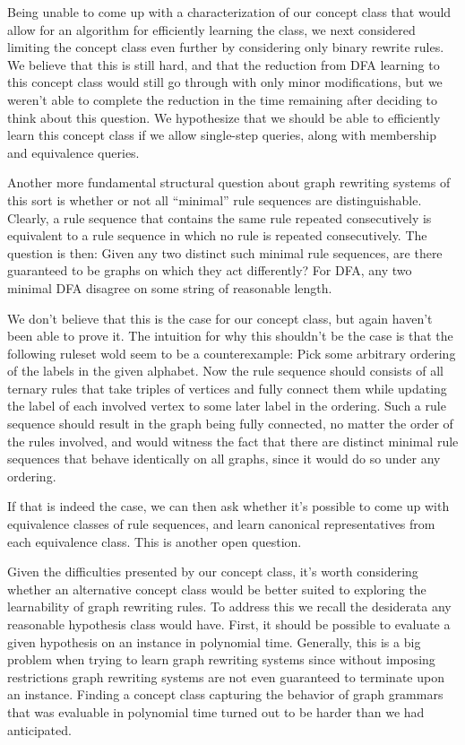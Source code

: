 \documentclass[]{article}
\begin{document}
Being unable to come up with a characterization of our concept class that would
allow for an algorithm for efficiently learning the class, we next considered
limiting the concept class even further by considering only binary rewrite
rules. We believe that this is still hard, and that the reduction from DFA
learning to this concept class would still go through with only minor
modifications, but we weren't able to complete the reduction in the time
remaining after deciding to think about this question. We hypothesize that we
should be able to efficiently learn this concept class if we allow single-step queries,
along with membership and equivalence queries.

Another more fundamental structural question about graph rewriting systems of
this sort is whether or not all ``minimal'' rule sequences are
distinguishable. Clearly, a rule sequence that contains the same rule repeated
consecutively is equivalent to a rule sequence in which no rule is repeated
consecutively. The question is then: Given any two distinct such minimal rule
sequences, are there guaranteed to be graphs on which they act differently? For
DFA, any two minimal DFA disagree on some string of reasonable length.

We don't believe that this is the case for our concept class, but again haven't
been able to prove it. The intuition for why this shouldn't be the case is that
the following ruleset wold seem to be a counterexample: Pick some arbitrary
ordering of the labels in the given alphabet. Now the rule sequence should
consists of all ternary rules that take triples of vertices and fully connect
them while updating the label of each involved vertex to some later label in the
ordering. Such a rule sequence should result in the graph being fully connected,
no matter the order of the rules involved, and would witness the fact that there
are distinct minimal rule sequences that behave identically on all graphs, since
it would do so under any ordering.

If that is indeed the case, we can then ask whether it's possible to come up
with equivalence classes of rule sequences, and learn canonical representatives
from each equivalence class. This is another open question.

Given the difficulties presented by our concept class, it's worth considering
whether an alternative concept class would be better suited to exploring the
learnability of graph rewriting rules. To address this we recall the desiderata
any reasonable hypothesis class would have. First, it should be possible to
evaluate a given hypothesis on an instance in polynomial
time. Generally, this is a big problem when trying to learn graph
rewriting systems since without imposing restrictions graph rewriting
systems are not even guaranteed to terminate upon an instance.
Finding a concept class capturing the behavior of graph grammars that
was evaluable in polynomial time turned out to be harder than we had
anticipated.
\end{document}
